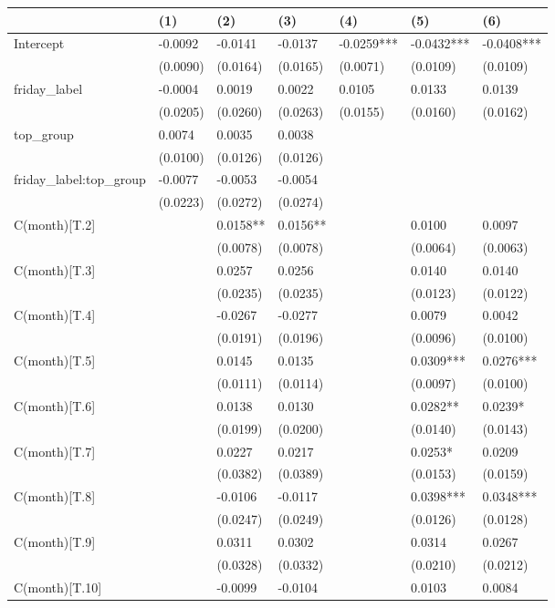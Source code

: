 \begin{tabular}{lllllll}
\toprule
 & (1) & (2) & (3) & (4) & (5) & (6) \\
\midrule
Intercept & -0.0092 & -0.0141 & -0.0137 & -0.0259*** & -0.0432*** & -0.0408*** \\
 & (0.0090) & (0.0164) & (0.0165) & (0.0071) & (0.0109) & (0.0109) \\
friday_label & -0.0004 & 0.0019 & 0.0022 & 0.0105 & 0.0133 & 0.0139 \\
 & (0.0205) & (0.0260) & (0.0263) & (0.0155) & (0.0160) & (0.0162) \\
top_group & 0.0074 & 0.0035 & 0.0038 &  &  &  \\
 & (0.0100) & (0.0126) & (0.0126) &  &  &  \\
friday_label:top_group & -0.0077 & -0.0053 & -0.0054 &  &  &  \\
 & (0.0223) & (0.0272) & (0.0274) &  &  &  \\
C(month)[T.2] &  & 0.0158** & 0.0156** &  & 0.0100 & 0.0097 \\
 &  & (0.0078) & (0.0078) &  & (0.0064) & (0.0063) \\
C(month)[T.3] &  & 0.0257 & 0.0256 &  & 0.0140 & 0.0140 \\
 &  & (0.0235) & (0.0235) &  & (0.0123) & (0.0122) \\
C(month)[T.4] &  & -0.0267 & -0.0277 &  & 0.0079 & 0.0042 \\
 &  & (0.0191) & (0.0196) &  & (0.0096) & (0.0100) \\
C(month)[T.5] &  & 0.0145 & 0.0135 &  & 0.0309*** & 0.0276*** \\
 &  & (0.0111) & (0.0114) &  & (0.0097) & (0.0100) \\
C(month)[T.6] &  & 0.0138 & 0.0130 &  & 0.0282** & 0.0239* \\
 &  & (0.0199) & (0.0200) &  & (0.0140) & (0.0143) \\
C(month)[T.7] &  & 0.0227 & 0.0217 &  & 0.0253* & 0.0209 \\
 &  & (0.0382) & (0.0389) &  & (0.0153) & (0.0159) \\
C(month)[T.8] &  & -0.0106 & -0.0117 &  & 0.0398*** & 0.0348*** \\
 &  & (0.0247) & (0.0249) &  & (0.0126) & (0.0128) \\
C(month)[T.9] &  & 0.0311 & 0.0302 &  & 0.0314 & 0.0267 \\
 &  & (0.0328) & (0.0332) &  & (0.0210) & (0.0212) \\
C(month)[T.10] &  & -0.0099 & -0.0104 &  & 0.0103 & 0.0084 \\

\end{tabular}
